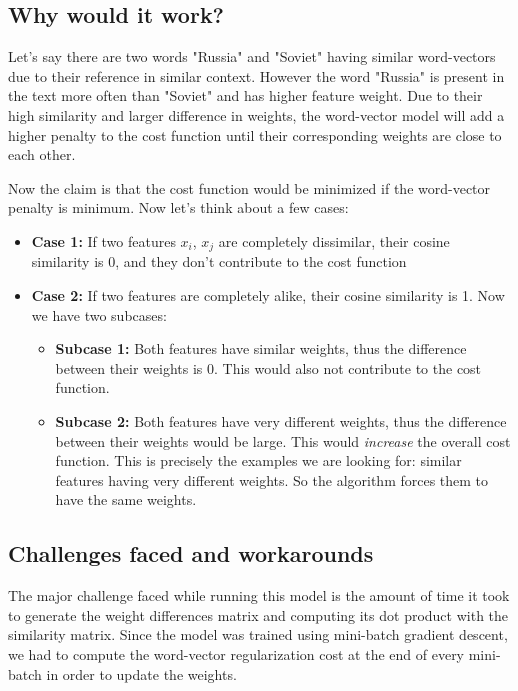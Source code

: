 \subsection{Why would it work?}

Let's say there are two words "Russia" and "Soviet" having similar word-vectors due to their reference in similar context. However the word "Russia" is present in the text more often than "Soviet" and has higher feature weight. Due to their high similarity and larger difference in weights, the word-vector model will add a higher penalty to the cost function until their corresponding weights are close to each other.

Now the claim is that the cost function would be minimized if the word-vector penalty is minimum. Now let's think about a few cases: 

\begin{itemize}
    \item \textbf{Case 1:} If two features $x_{i}$, $x_{j}$ are completely dissimilar, their cosine similarity is 0, and they don't contribute to the cost function
    \item \textbf{Case 2:} If two features are completely alike, their cosine similarity is 1. Now we have two subcases:
    \begin{itemize}
        \item \textbf{Subcase 1:} Both features have similar weights, thus the difference between their weights is 0. This would also not contribute to the cost function.
        
        \item \textbf{Subcase 2:} Both features have very different weights, thus the difference between their weights would be large. This would \textit{increase} the overall cost function. This is precisely the examples we are looking for: similar features having very different weights. So the algorithm forces them to have the same weights.
    \end{itemize}
\end{itemize}

\subsection{Challenges faced and workarounds}

The major challenge faced while running this model is the amount of time it took to generate the weight differences matrix and computing its dot product with the similarity matrix. Since the model was trained using mini-batch gradient descent, we had to compute the word-vector regularization cost at the end of every mini-batch in order to update the weights. 

